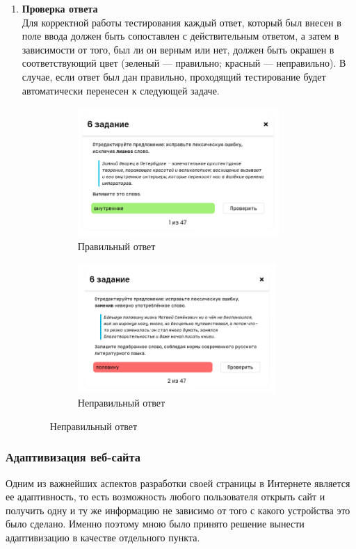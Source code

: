 \documentclass[a4paper, 12pt]{extarticle}
\begin{document}
\begin{enumerate}
\vspace{2mm}
\item {\textbf{Проверка ответа}}\\
    Для корректной работы тестирования каждый ответ, который был внесен в поле
    ввода должен быть сопоставлен с действительным ответом, а затем в
    зависимости от того, был ли он верным или нет, должен быть окрашен в
    соответствующий цвет (зеленый — правильно; красный — неправильно). В
    случае, если ответ был дан правильно, проходящий тестирование будет
    автоматически перенесен к следующей задаче.
    \begin{figure}[h]
        \begin{subfigure}{.5\textwidth}
            \centering
            \includegraphics[height=140pt]{./img/correctAnswer.png}
            \caption{Правильный ответ}
        \end{subfigure}
        \begin{subfigure}{.5\textwidth}
            \centering
            \includegraphics[height=140pt]{./img/incorrectAnswer.png}
            \caption{Неправильный ответ}
        \end{subfigure}
    \end{figure}
\end{enumerate}
\newpage

\subsubsection{Адаптивизация веб-сайта}
Одним из важнейших аспектов разработки своей страницы в Интернете является
ее адаптивность, то есть возможность любого пользователя открыть сайт и
получить одну и ту же информацию не зависимо от того с какого устройства это
было сделано. Именно поэтому мною было принято решение вынести адаптивизацию в
качестве отдельного пункта.
\\
\end{document}
